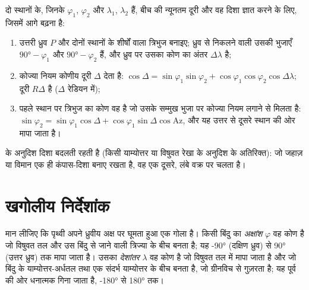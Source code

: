 \begin{method}[गोले पर दूरी और दिशा]\label{met:b1:spherical-astronomy:great-circle}
दो स्थानों के, जिनके  $\varphi_1$, $\varphi_2$ और  $\lambda_1$, $\lambda_2$ हैं,
बीच की न्यूनतम दूरी और वह दिशा ज्ञात करने के लिए, जिसमें आगे बढ़ना है:
\begin{enumerate}
  \item उत्तरी ध्रुव $P$ और दोनों स्थानों के शीर्षों वाला त्रिभुज बनाइए; ध्रुव से निकलने वाली
        उसकी भुजाएँ  $\ang{90} -
        \varphi_1$ और $\ang{90} - \varphi_2$ हैं, और ध्रुव
        पर उसका कोण  का अंतर $\Delta\lambda$ है;
  \item कोज्या नियम कोणीय दूरी $\Delta$ देता है:
        $\cos\Delta = \sin\varphi_1\sin\varphi_2 +
        \cos\varphi_1\cos\varphi_2\cos\Delta\lambda$; दूरी $R\Delta$ है ($\Delta$ रेडियन में);
  \item पहले स्थान पर त्रिभुज का कोण वह है जो उसके सम्मुख भुजा पर कोज्या नियम लगाने से मिलता है:
        $\sin\varphi_2 = \sin\varphi_1\cos\Delta + \cos\varphi_1\sin\Delta\cos
        \mathrm{Az}$, और यह उत्तर से दूसरे स्थान की ओर मापा जाता है।
\end{enumerate}
 के अनुदिश दिशा बदलती रहती है (किसी याम्योत्तर या विषुवत रेखा के अनुदिश के
अतिरिक्त): जो जहाज़ या विमान एक ही कंपास-दिशा बनाए रखता है, वह एक दूसरे, लंबे वक्र पर चलता है।
\end{method}

\section{खगोलीय निर्देशांक}

\begin{definition}[अक्षांश और देशांतर]\label{def:b1:spherical-astronomy:geographic}
मान लीजिए कि पृथ्वी अपने ध्रुवीय अक्ष पर घूमता हुआ एक गोला है। किसी बिंदु का
\emph{अक्षांश} $\varphi$ वह कोण है जो विषुवत तल और उस बिंदु से जाने वाली
त्रिज्या के बीच बनता है; यह \ang{-90} (दक्षिण ध्रुव) से \ang{+90} (उत्तर ध्रुव) तक मापा
जाता है। उसका \emph{देशांतर} $\lambda$ वह कोण है जो विषुवत तल में मापा जाता
है और जो बिंदु के याम्योत्तर-अर्धतल तथा एक संदर्भ याम्योत्तर के बीच बनता है, जो ग्रीनविच
से गुज़रता है; यह पूर्व की ओर धनात्मक गिना जाता है, \ang{-180} से \ang{180} तक।
\end{definition}


